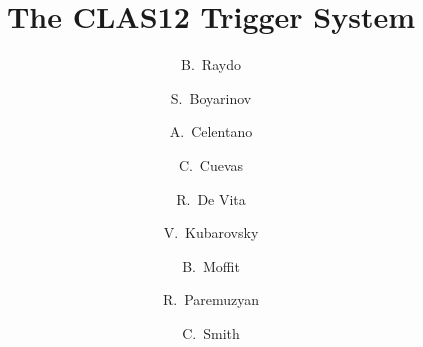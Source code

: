 \title{The CLAS12 Trigger System}

\author[A]{B.~Raydo}
\author[A]{S.~Boyarinov}
\author[B]{A.~Celentano}
\author[A]{C.~Cuevas}
\author[B]{R.~De Vita}
\author[A]{V.~Kubarovsky}
\author[A]{B.~Moffit}
\author[A]{R.~Paremuzyan}
\author[A]{C.~Smith}

\address[A]{Thomas Jefferson National Accelerator Facility, Newport News, VA, USA}
\address[B]{INFN, Milan, Italy}
